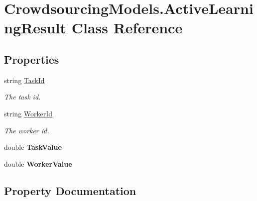 \hypertarget{class_crowdsourcing_models_1_1_active_learning_result}{}\section{Crowdsourcing\+Models.\+Active\+Learning\+Result Class Reference}
\label{class_crowdsourcing_models_1_1_active_learning_result}
\subsection*{Properties}
\begin{DoxyCompactItemize}
\item 
string \hyperlink{class_crowdsourcing_models_1_1_active_learning_result_aa64ee320de4115d144c1828eb0ad0f35}{Task\+Id}
\begin{DoxyCompactList}\small\item\em The task id. \end{DoxyCompactList}\item 
string \hyperlink{class_crowdsourcing_models_1_1_active_learning_result_a571a628b29d15458681a4536c0ddda8f}{Worker\+Id}
\begin{DoxyCompactList}\small\item\em The worker id. \end{DoxyCompactList}\item 
\hypertarget{class_crowdsourcing_models_1_1_active_learning_result_ace11bf145e9a2cf8de9e4b4109a68bde}{}double {\bfseries Task\+Value}\label{class_crowdsourcing_models_1_1_active_learning_result_ace11bf145e9a2cf8de9e4b4109a68bde}

\item 
\hypertarget{class_crowdsourcing_models_1_1_active_learning_result_ae3b09418e3b1b19a555b565aec58666a}{}double {\bfseries Worker\+Value}\label{class_crowdsourcing_models_1_1_active_learning_result_ae3b09418e3b1b19a555b565aec58666a}

\end{DoxyCompactItemize}


\subsection{Property Documentation}
\hypertarget{class_crowdsourcing_models_1_1_active_learning_result_aa64ee320de4115d144c1828eb0ad0f35}{}
